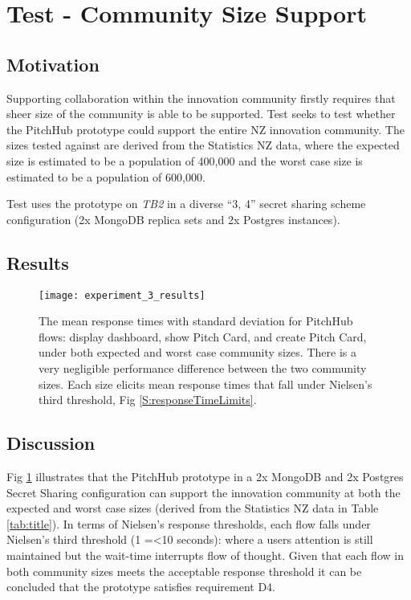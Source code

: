 \section{Test  - Community Size Support}

\subsection{Motivation}
Supporting collaboration within the innovation community firstly requires that sheer size of the community is able to be supported. Test  seeks to test whether the PitchHub prototype could support the entire NZ innovation community. The sizes tested against are derived from the Statistics NZ data, where the expected size is estimated to be a population of 400,000 and the worst case size is estimated to be a population of 600,000.

Test  uses the prototype on \textit{TB2} in a diverse ``3, 4'' secret sharing scheme configuration (2x MongoDB replica sets and 2x Postgres instances).

\subsection{Results}

\begin{figure}[H]
    \centering
    \texttt{[image: experiment\_3\_results]}
    \caption{The mean response times with standard deviation for PitchHub flows: display dashboard, show Pitch Card, and create Pitch Card, under both expected and worst case community sizes. There is a very negligible performance difference between the two community sizes. Each size elicits mean response times that fall under Nielsen's third threshold, Fig \ref{S:responseTimeLimits}. }
    \label{fig:test_3_results}
\end{figure}

\subsection{Discussion}

Fig \ref{fig:test_3_results} illustrates that the PitchHub prototype in a 2x MongoDB and 2x Postgres Secret Sharing configuration can support the innovation community at both the expected and worst case sizes (derived from the Statistics NZ data in Table \ref{tab:title}). In terms of Nielsen's response thresholds, each flow falls under Nielsen's third threshold (1 =\textless 10 seconds): where a users attention is still maintained but the wait-time interrupts flow of thought. Given that each flow in both community sizes meets the acceptable response threshold it can be concluded that the prototype satisfies requirement D4.

